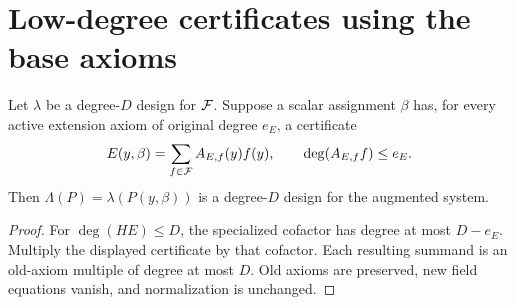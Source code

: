 \chapter{Low-degree certificates using the base axioms}\label{ch:baseaware}

\begin{lemma}\label{lem:certificate-scalar}
Let $\lambda$ be a degree-$D$ design for $\mathcal F$. Suppose a scalar assignment $\beta$ has, for every active extension axiom of original degree $e_E$, a certificate
\[
 E(y,\beta)=\sum_{f\in\mathcal F}A_{E,f}(y)f(y),
 \qquad\deg(A_{E,f}f)\le e_E.
\]
Then $\Lambda(P)=\lambda(P(y,\beta))$ is a degree-$D$ design for the augmented system.
\end{lemma}
\begin{proof}
For $\deg(HE)\le D$, the specialized cofactor has degree at most $D-e_E$. Multiply the displayed certificate by that cofactor. Each resulting summand is an old-axiom multiple of degree at most $D$. Old axioms are preserved, new field equations vanish, and normalization is unchanged.
\end{proof}

